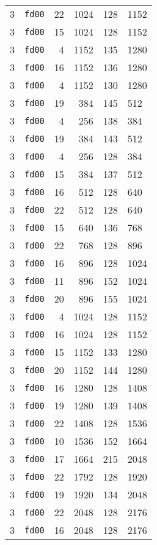 \documentclass{article}
\begin{document}
\begin{table}[h!]
\begin{tabular}{llrrrl}
    3 & \texttt{fd00} & 22 & 1024 & 128 & 1152 \\
    3 & \texttt{fd00} & 15 & 1024 & 128 & 1152 \\
    3 & \texttt{fd00} & 4 & 1152 & 135 & 1280 \\
    3 & \texttt{fd00} & 16 & 1152 & 136 & 1280 \\
    3 & \texttt{fd00} & 4 & 1152 & 130 & 1280 \\
    3 & \texttt{fd00} & 19 & 384 & 145 & 512 \\
    3 & \texttt{fd00} & 4 & 256 & 138 & 384 \\
    3 & \texttt{fd00} & 19 & 384 & 143 & 512 \\
    3 & \texttt{fd00} & 4 & 256 & 128 & 384 \\
    3 & \texttt{fd00} & 15 & 384 & 137 & 512 \\
    3 & \texttt{fd00} & 16 & 512 & 128 & 640 \\
    3 & \texttt{fd00} & 22 & 512 & 128 & 640 \\
    3 & \texttt{fd00} & 15 & 640 & 136 & 768 \\
    3 & \texttt{fd00} & 22 & 768 & 128 & 896 \\
    3 & \texttt{fd00} & 16 & 896 & 128 & 1024 \\
    3 & \texttt{fd00} & 11 & 896 & 152 & 1024 \\
    3 & \texttt{fd00} & 20 & 896 & 155 & 1024 \\
    3 & \texttt{fd00} & 4 & 1024 & 128 & 1152 \\
    3 & \texttt{fd00} & 16 & 1024 & 128 & 1152 \\
    3 & \texttt{fd00} & 15 & 1152 & 133 & 1280 \\
    3 & \texttt{fd00} & 20 & 1152 & 144 & 1280 \\
    3 & \texttt{fd00} & 16 & 1280 & 128 & 1408 \\
    3 & \texttt{fd00} & 19 & 1280 & 139 & 1408 \\
    3 & \texttt{fd00} & 22 & 1408 & 128 & 1536 \\
    3 & \texttt{fd00} & 10 & 1536 & 152 & 1664 \\
    3 & \texttt{fd00} & 17 & 1664 & 215 & 2048 \\
    3 & \texttt{fd00} & 22 & 1792 & 128 & 1920 \\
    3 & \texttt{fd00} & 19 & 1920 & 134 & 2048 \\
    3 & \texttt{fd00} & 22 & 2048 & 128 & 2176 \\
    3 & \texttt{fd00} & 16 & 2048 & 128 & 2176 \\

\end{tabular}
\end{table}
\end{document}
